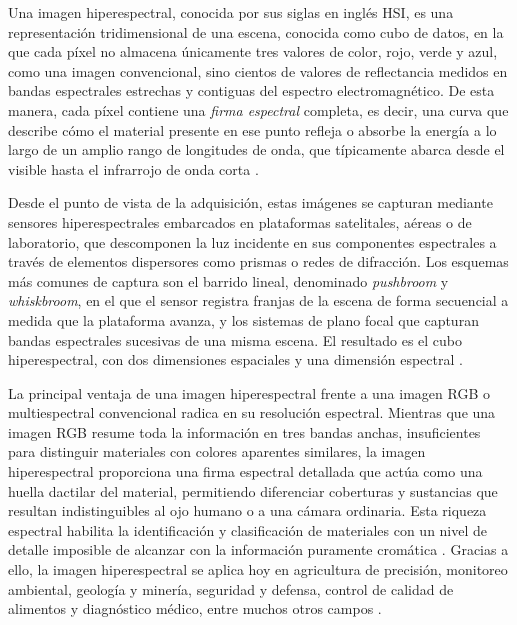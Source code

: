 
Una imagen hiperespectral, conocida por sus siglas en inglés HSI, es una representación tridimensional de una escena, conocida como cubo de datos, en la que cada píxel no almacena únicamente tres valores de color, rojo, verde y azul, como una imagen convencional, sino cientos de valores de reflectancia medidos en bandas espectrales estrechas y contiguas del espectro electromagnético. De esta manera, cada píxel contiene una \textit{firma espectral} completa, es decir, una curva que describe cómo el material presente en ese punto refleja o absorbe la energía a lo largo de un amplio rango de longitudes de onda, que típicamente abarca desde el visible hasta el infrarrojo de onda corta \parencite{bhargava2024hyperspectral}.

Desde el punto de vista de la adquisición, estas imágenes se capturan mediante sensores hiperespectrales embarcados en plataformas satelitales, aéreas o de laboratorio, que descomponen la luz incidente en sus componentes espectrales a través de elementos dispersores como prismas o redes de difracción. Los esquemas más comunes de captura son el barrido lineal, denominado \textit{pushbroom} y \textit{whiskbroom}, en el que el sensor registra franjas de la escena de forma secuencial a medida que la plataforma avanza, y los sistemas de plano focal que capturan bandas espectrales sucesivas de una misma escena. El resultado es el cubo hiperespectral, con dos dimensiones espaciales y una dimensión espectral \parencite{bhargava2024hyperspectral}.

La principal ventaja de una imagen hiperespectral frente a una imagen RGB o multiespectral convencional radica en su resolución espectral. Mientras que una imagen RGB resume toda la información en tres bandas anchas, insuficientes para distinguir materiales con colores aparentes similares, la imagen hiperespectral proporciona una firma espectral detallada que actúa como una huella dactilar del material, permitiendo diferenciar coberturas y sustancias que resultan indistinguibles al ojo humano o a una cámara ordinaria. Esta riqueza espectral habilita la identificación y clasificación de materiales con un nivel de detalle imposible de alcanzar con la información puramente cromática \parencite{bhargava2024hyperspectral}. Gracias a ello, la imagen hiperespectral se aplica hoy en agricultura de precisión, monitoreo ambiental, geología y minería, seguridad y defensa, control de calidad de alimentos y diagnóstico médico, entre muchos otros campos \parencite{bhargava2024hyperspectral}.

